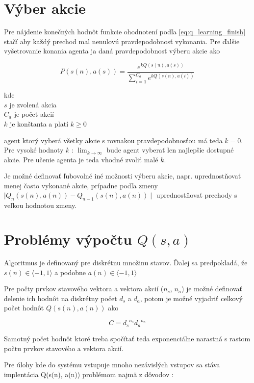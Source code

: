\section{Výber akcie}

Pre nájdenie konečných hodnôt funkcie ohodnotení podľa \ref{eq:q_learning_finish}
stačí aby každý prechod mal nenulovú pravdepodobnosť vykonania. Pre ďalšie vyšetrovanie
konania agenta ja daná pravdepodobnosť výberu akcie  ako

\begin{equation}
P(s(n), a(s)) = \frac{e^{kQ(s(n), a(s))}}{ \sum\limits_{i=1}^{C_a}{e^{kQ(s(n), a(i))}} }
\label{eq:action_selection}
\end{equation}

kde \\
$s$ je zvolená akcia \\
$C_a$ je počet akcií \\
$k$ je konštanta a platí $k \geq 0$

agent ktorý vyberá všetky akcie s rovnakou pravdepodobnosťou má teda $k = 0$.
Pre vysoké hodnoty $k$ : $\lim_{k\to\infty}$ bude agent vyberať len najlepšie
dostupné akcie. Pre učenie agenta je teda vhodné zvoliť malé $k$.

Je možné definovať ľubovolné iné možnosti výberu akcie, napr. uprednostňovať menej
často vykonané akcie, prípadne podľa zmeny
$\mid Q_{n}(s(n), a(n)) - Q_{n-1}(s(n), a(n)) \mid$ uprednostňovať prechody s veľkou hodnotou zmeny.


\section{Problémy výpočtu $Q(s, a)$}

Algoritmus je definovaný pre diskrétnu množinu stavov. Ďalej sa predpokladá, že
$s(n) \in \langle -1, 1 \rangle$ a podobne $a(n) \in \langle -1, 1 \rangle$

 Pre počty prvkov
stavového vektora a vektora akcií ($n_s$, $n_a$) je možné definovať
delenie ich hodnôt na diskrétny počet $d_s$ a $d_a$, potom je možné vyjadriť celkový počet
hodnôt $Q(s(n), a(n))$ ako

\begin{equation}
C = {d_s}^{n_s} {d_a}^{n_a}
\label{eq:q_size}
\end{equation}

Samotný počet hodnôt ktoré treba spočítať teda exponenciálne narastná s rastom
počtu prvkov stavového a vektora akcií.

Pre úlohy kde do systému vstupuje mnoho nezávislých vstupov sa stáva implentácia Q(s(n), a(n))
problémom najmä z dôvodov :

